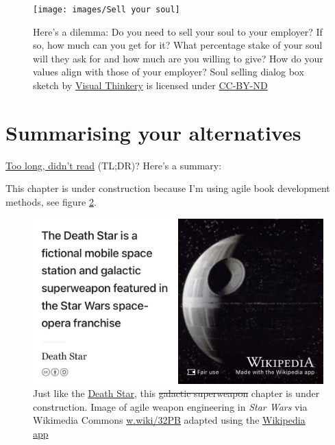 \documentclass[
]{book}
\begin{document}
\begin{figure}

{\centering \texttt{[image: images/Sell your soul]} 

}

\caption{Here's a dilemma: Do you need to sell your soul to your employer? If so, how much can you get for it? What percentage stake of your soul will they ask for and how much are you willing to give? How do your values align with those of your employer? Soul selling dialog box sketch by \href{https://visualthinkery.com/}{Visual Thinkery} is licensed under \href{https://creativecommons.org/licenses/by-nd/4.0/}{CC-BY-ND}}\label{fig:soul-fig}
\end{figure}



\hypertarget{tldr11}{%
\section{Summarising your alternatives}\label{tldr11}}

\href{https://en.wiktionary.org/wiki/too_long;_didn\%27t_read}{Too long, didn't read} (TL;DR)? Here's a summary:

This chapter is under construction because I'm using agile book development methods, see figure \ref{fig:deathstar8-fig}.

\begin{figure}

{\centering \includegraphics[width=0.99\linewidth]{images/DeathStar2} 

}

\caption{Just like the \href{https://en.wikipedia.org/wiki/Death_Star}{Death Star}, this \sout{galactic superweapon} chapter is under construction. Image of agile weapon engineering in \emph{Star Wars} via Wikimedia Commons \href{https://w.wiki/32PB}{w.wiki/32PB} adapted using the \href{https://apps.apple.com/gb/app/wikipedia/id324715238}{Wikipedia app}}\label{fig:deathstar8-fig}
\end{figure}
\end{document}
